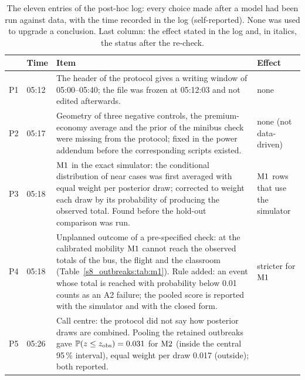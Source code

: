 \begin{table}[tbp]
  \centering\footnotesize
  \caption{The eleven entries of the post-hoc log: every choice made after a model had been run against data,
  with the time recorded in the log (self-reported). None was used to upgrade a conclusion. Last column: the
  effect stated in the log and, in italics, the status after the re-check.}
  \label{appC_protocol:tab:posthoc}
  \begin{tabular}{@{}ll>{\raggedright\arraybackslash}p{}>{\raggedright\arraybackslash}p{}@{}}
    \toprule
    & Time & Item & Effect \\
    \midrule
    P1 & 05:12 & The header of the protocol gives a writing window of 05:00--05:40; the file was frozen at
                 05:12:03 and not edited afterwards. & none \\
    P2 & 05:17 & Geometry of three negative controls, the premium-economy average and the prior of the
                 minibus check were missing from the protocol; fixed in the power addendum before the
                 corresponding scripts existed. & none (not data-driven) \\
    P3 & 05:18 & $\mathrm{M1}$ in the exact simulator: the conditional distribution of near cases was first averaged
                 with equal weight per posterior draw; corrected to weight each draw by its probability of
                 producing the observed total. Found before the hold-out comparison was run. &
                 $\mathrm{M1}$ rows that use the simulator \\
    P4 & 05:18 & Unplanned outcome of a pre-specified check: at the calibrated mobility $\mathrm{M1}$ cannot reach
                 the observed totals of the bus, the flight and the classroom
                 (Table~\ref{s8_outbreaks:tab:m1}). Rule added: an event whose total is reached with
                 probability below 0.01 counts as an A2 failure; the pooled score is reported with the
                 simulator and with the closed form. & stricter for $\mathrm{M1}$ \\
    P5 & 05:26 & Call centre: the protocol did not say how posterior draws are combined. Pooling the retained
                 outbreaks gave $\mathbb{P}(z\le z_{\mathrm{obs}})=0.031$ for $\mathrm{M2}$ (inside the central 95\,\%
                 interval), equal weight per draw 0.017 (outside); both reported. &

\end{tabular}
\end{table}
